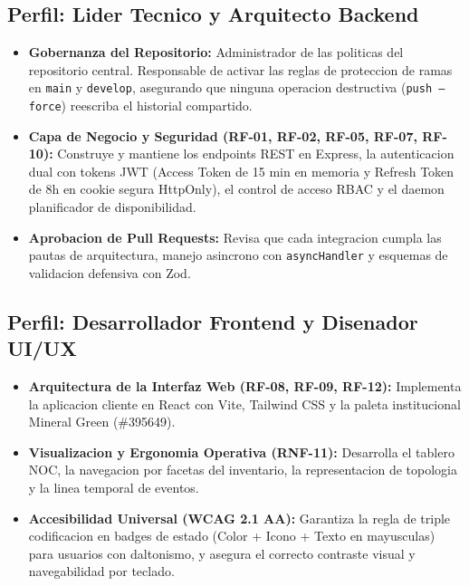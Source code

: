 \documentclass[12pt,a4paper]{report}
\begin{document}
\subsection{Perfil: Lider Tecnico y Arquitecto Backend}
\begin{itemize}
  \item \textbf{Gobernanza del Repositorio:} Administrador de las politicas del repositorio central. Responsable de activar las reglas de proteccion de ramas en \texttt{main} y \texttt{develop}, asegurando que ninguna operacion destructiva (\texttt{push --force}) reescriba el historial compartido.
  \item \textbf{Capa de Negocio y Seguridad (RF-01, RF-02, RF-05, RF-07, RF-10):} Construye y mantiene los endpoints REST en Express, la autenticacion dual con tokens JWT (Access Token de 15 min en memoria y Refresh Token de 8h en cookie segura HttpOnly), el control de acceso RBAC y el daemon planificador de disponibilidad.
  \item \textbf{Aprobacion de Pull Requests:} Revisa que cada integracion cumpla las pautas de arquitectura, manejo asincrono con \texttt{asyncHandler} y esquemas de validacion defensiva con Zod.
\end{itemize}

\subsection{Perfil: Desarrollador Frontend y Disenador UI/UX}
\begin{itemize}
  \item \textbf{Arquitectura de la Interfaz Web (RF-08, RF-09, RF-12):} Implementa la aplicacion cliente en React con Vite, Tailwind CSS y la paleta institucional Mineral Green (\#395649).
  \item \textbf{Visualizacion y Ergonomia Operativa (RNF-11):} Desarrolla el tablero NOC, la navegacion por facetas del inventario, la representacion de topologia y la linea temporal de eventos.
  \item \textbf{Accesibilidad Universal (WCAG 2.1 AA):} Garantiza la regla de triple codificacion en badges de estado (Color + Icono + Texto en mayusculas) para usuarios con daltonismo, y asegura el correcto contraste visual y navegabilidad por teclado.
\end{itemize}
\end{document}
